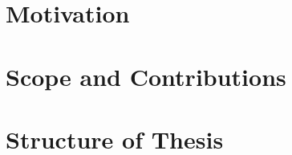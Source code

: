 
\section{Motivation}
\label{sec:Introduction:Motivation}


\section{Scope and Contributions}
\label{sec:Introduction:ScopeAndContributions}


%

\section{Structure of Thesis}
\label{sec:Introduction:StructureOfThesis}

